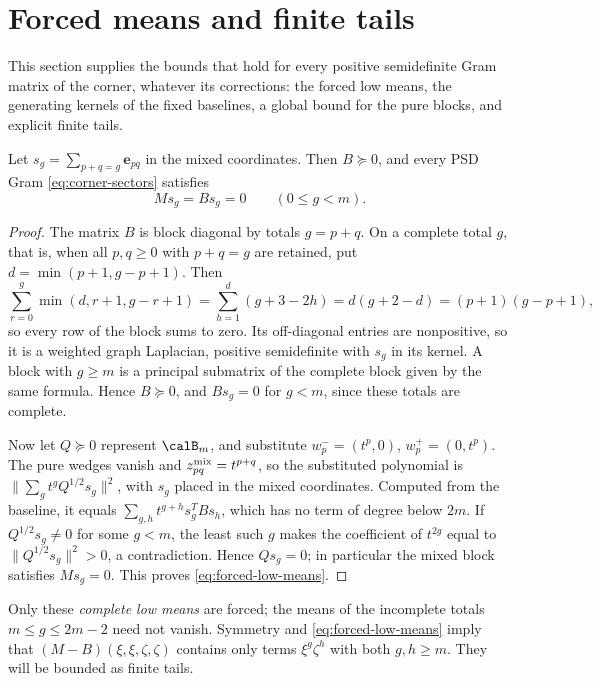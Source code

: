 \section{Forced means and finite tails}\label{sec:tails}
This section supplies the bounds that hold for every positive
semidefinite Gram matrix of the corner, whatever its corrections: the
forced low means, the generating kernels of the fixed baselines, a
global bound for the pure blocks, and explicit finite tails.


\begin{lemma}\label{lem:means} Let
\(s_g=\sum_{p+q=g}\mathbf e_{pq}\) in the mixed coordinates. Then \(B\succeq0\),
and every PSD Gram \eqref{eq:corner-sectors} satisfies
\begin{equation}
 Ms_g=Bs_g=0\qquad(0\le g<m).                          \label{eq:forced-low-means}
\end{equation}

\end{lemma}
\begin{proof} The matrix $B$ is block diagonal by totals $g=p+q$. On a
complete total $g$, that is, when all $p,q\ge0$ with $p+q=g$ are
retained, put \(d=\min(p+1,g-p+1)\). Then
\[
 \sum_{r=0}^g\min(d,r+1,g-r+1)
 =\sum_{h=1}^{d}(g+3-2h)
 =d(g+2-d)=(p+1)(g-p+1),
\]
so every row of the block sums to zero. Its off-diagonal entries are
nonpositive, so it is a weighted graph Laplacian, positive semidefinite
with $s_g$ in its kernel. A block with $g\ge m$ is a principal submatrix
of the complete block given by the same formula. Hence $B\succeq0$, and
$Bs_g=0$ for $g<m$, since these totals are complete.

Now let $Q\succeq0$ represent $\calB_m$, and substitute
\(w_p^-=(t^p,0)\), \(w_p^+=(0,t^p)\). The pure wedges vanish and
$z^{\rm mix}_{pq}=t^{p+q}$, so the substituted polynomial is
$\|\sum_gt^gQ^{1/2}s_g\|^2$, with $s_g$ placed in the mixed coordinates.
Computed from the baseline, it equals $\sum_{g,h}t^{g+h}s_g^TBs_h$,
which has no term of degree below $2m$. If $Q^{1/2}s_g\ne0$ for some
$g<m$, the least such $g$ makes the coefficient of $t^{2g}$ equal to
$\|Q^{1/2}s_g\|^2>0$, a contradiction. Hence $Qs_g=0$; in particular the
mixed block satisfies $Ms_g=0$. This proves \eqref{eq:forced-low-means}. \end{proof}

Only these \emph{complete low means} are forced; the means of the
incomplete totals \(m\le g\le2m-2\) need not vanish. Symmetry and \eqref{eq:forced-low-means} imply
that \((M-B)(\xi,\xi,\zeta,\zeta)\) contains only terms \(\xi^g\zeta^h\) with both \(g,h\ge m\).
They will be bounded as finite tails.

